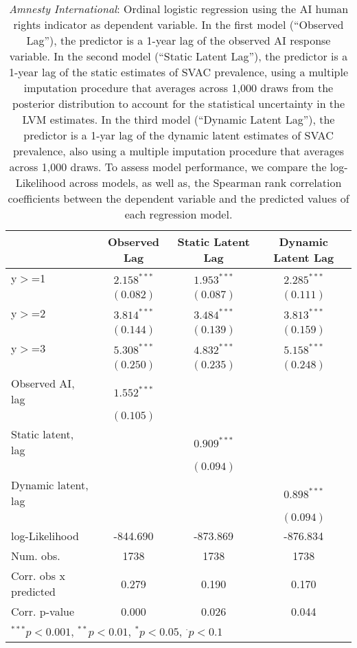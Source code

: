 
\begin{table}[h]
\begin{center}
\begin{tabular}{l c c c }
\hline
 & Observed Lag & Static Latent Lag & Dynamic Latent Lag \\
\hline
y$>$=1                & $2.158^{***}$ & $1.953^{***}$ & $2.285^{***}$ \\
                      & $(0.082)$     & $(0.087)$     & $(0.111)$     \\
y$>$=2                & $3.814^{***}$ & $3.484^{***}$ & $3.813^{***}$ \\
                      & $(0.144)$     & $(0.139)$     & $(0.159)$     \\
y$>$=3                & $5.308^{***}$ & $4.832^{***}$ & $5.158^{***}$ \\
                      & $(0.250)$     & $(0.235)$     & $(0.248)$     \\
Observed AI, lag      & $1.552^{***}$ &               &               \\
                      & $(0.105)$     &               &               \\
Static  latent, lag   &               & $0.909^{***}$ &               \\
                      &               & $(0.094)$     &               \\
Dynamic latent, lag   &               &               & $0.898^{***}$ \\
                      &               &               & $(0.094)$     \\
\hline
log-Likelihood        & -844.690      & -873.869      & -876.834      \\
Num. obs.             & 1738          & 1738          & 1738          \\
Corr. obs x predicted & 0.279         & 0.190         & 0.170         \\
Corr. p-value         & 0.000         & 0.026         & 0.044         \\
\hline
\multicolumn{4}{l}{\scriptsize{$^{***}p<0.001$, $^{**}p<0.01$, $^*p<0.05$, $^{\cdot}p<0.1$}}
\end{tabular}
\caption{\emph{Amnesty International}: Ordinal logistic regression using the AI human rights 
       indicator as dependent variable. In the first model (``Observed Lag''), the predictor is a 1-year lag
       of the observed AI response variable. In the second model (``Static Latent Lag''), the predictor is a 1-year
       lag of the static estimates of SVAC prevalence, using a multiple imputation procedure that averages across 1,000 draws 
        from the posterior distribution to account for the statistical uncertainty in the LVM estimates. 
       In the third model (``Dynamic Latent Lag''), the predictor is a 1-yar lag of the dynamic latent 
       estimates of SVAC prevalence, also using a multiple imputation procedure that averages across 1,000 draws. To assess
       model performance, we compare the log-Likelihood across models, as well as, the Spearman rank
       correlation coefficients between the dependent variable and the predicted values of each regression
       model.}
\label{xt-ai}
\end{center}
\end{table}
